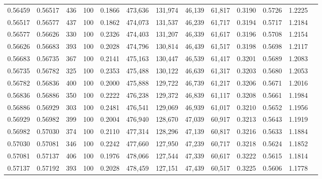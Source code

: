 \begin{tabular}{rrrrrrrrrrrrr}
0.56459 & 0.56517 &   436 & 100 &                                     0.1866 & 473,636 & 131,974 &  46,139 &  61,817 & 0.3190 & 0.5726 & 1.2225 \\
0.56517 & 0.56577 &   437 & 100 &                                     0.1862 & 474,073 & 131,537 &  46,239 &  61,717 & 0.3194 & 0.5717 & 1.2184 \\
0.56577 & 0.56626 &   330 & 100 &                                     0.2326 & 474,403 & 131,207 &  46,339 &  61,617 & 0.3196 & 0.5708 & 1.2154 \\
0.56626 & 0.56683 &   393 & 100 &                                     0.2028 & 474,796 & 130,814 &  46,439 &  61,517 & 0.3198 & 0.5698 & 1.2117 \\
0.56683 & 0.56735 &   367 & 100 &                                     0.2141 & 475,163 & 130,447 &  46,539 &  61,417 & 0.3201 & 0.5689 & 1.2083 \\
0.56735 & 0.56782 &   325 & 100 &                                     0.2353 & 475,488 & 130,122 &  46,639 &  61,317 & 0.3203 & 0.5680 & 1.2053 \\
0.56782 & 0.56836 &   400 & 100 &                                     0.2000 & 475,888 & 129,722 &  46,739 &  61,217 & 0.3206 & 0.5671 & 1.2016 \\
0.56836 & 0.56886 &   350 & 100 &                                     0.2222 & 476,238 & 129,372 &  46,839 &  61,117 & 0.3208 & 0.5661 & 1.1984 \\
0.56886 & 0.56929 &   303 & 100 &                                     0.2481 & 476,541 & 129,069 &  46,939 &  61,017 & 0.3210 & 0.5652 & 1.1956 \\
0.56929 & 0.56982 &   399 & 100 &                                     0.2004 & 476,940 & 128,670 &  47,039 &  60,917 & 0.3213 & 0.5643 & 1.1919 \\
0.56982 & 0.57030 &   374 & 100 &                                     0.2110 & 477,314 & 128,296 &  47,139 &  60,817 & 0.3216 & 0.5633 & 1.1884 \\
0.57030 & 0.57081 &   346 & 100 &                                     0.2242 & 477,660 & 127,950 &  47,239 &  60,717 & 0.3218 & 0.5624 & 1.1852 \\
0.57081 & 0.57137 &   406 & 100 &                                     0.1976 & 478,066 & 127,544 &  47,339 &  60,617 & 0.3222 & 0.5615 & 1.1814 \\
0.57137 & 0.57192 &   393 & 100 &                                     0.2028 & 478,459 & 127,151 &  47,439 &  60,517 & 0.3225 & 0.5606 & 1.1778 \\

\end{tabular}
